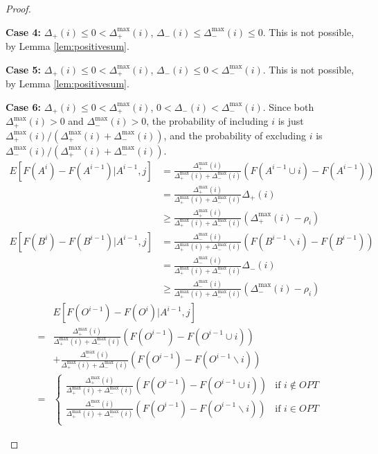 \documentclass{article} %
\begin{document}
\begin{proof}
\begin{description}
\item\textbf{Case 4:} $\Delta_+(i) \leq 0 < \Delta_+^{\max}(i)$, $\Delta_-(i) \leq \Delta_-^{\max}(i) \leq 0$.
This is not possible, by Lemma \ref{lem:positivesum}.

\item\textbf{Case 5:} $\Delta_+(i) \leq 0 < \Delta_+^{\max}(i)$, $\Delta_-(i) \leq 0 < \Delta_-^{\max}(i)$.
This is not possible, by Lemma \ref{lem:positivesum}.

\item\textbf{Case 6:} $\Delta_+(i) \leq 0 < \Delta_+^{\max}(i)$, $0 < \Delta_-(i) < \Delta_-^{\max}(i)$.
Since both $\Delta_+^{\max}(i)>0$ and $\Delta_-^{\max}(i)>0$, the probability of including $i$ is just $\Delta_+^{\max}(i) / (\Delta_+^{\max}(i) + \Delta_-^{\max}(i))$, and the probability of excluding $i$ is $\Delta_-^{\max}(i) / (\Delta_+^{\max}(i) + \Delta_-^{\max}(i))$.
\begin{align*}
E[F(A^i) - F(A^{i-1}) | A^{i-1}, j]
&= \frac{\Delta_+^{\max}(i)}{\Delta_+^{\max}(i) + \Delta_-^{\max}(i)} (F(A^{i-1}\cup i) - F(A^{i-1}))\\
&= \frac{\Delta_+^{\max}(i)}{\Delta_+^{\max}(i) + \Delta_-^{\max}(i)} \Delta_+(i)\\
&\geq \frac{\Delta_+^{\max}(i)}{\Delta_+^{\max}(i) + \Delta_-^{\max}(i)} (\Delta_+^{\max}(i) - \rho_i)\\
E[F(B^i) - F(B^{i-1}) | A^{i-1}, j]
&= \frac{\Delta_-^{\max}(i)}{\Delta_+^{\max}(i) + \Delta_-^{\max}(i)} (F(B^{i-1}\backslash i) - F(B^{i-1}))\\
&= \frac{\Delta_-^{\max}(i)}{\Delta_+^{\max}(i) + \Delta_-^{\max}(i)} \Delta_-(i)\\
&\geq \frac{\Delta_-^{\max}(i)}{\Delta_+^{\max}(i) + \Delta_-^{\max}(i)} (\Delta_-^{\max}(i) - \rho_i)
\end{align*}
\begin{align*}
&E[F(O^{i-1}) - F(O^i) | A^{i-1}, j]\\
=&   \frac{\Delta_+^{\max}(i)}{\Delta_+^{\max}(i) + \Delta_-^{\max}(i)} (F(O^{i-1}) - F(O^{i-1} \cup i)) \\
 & + \frac{\Delta_-^{\max}(i)}{\Delta_+^{\max}(i) + \Delta_-^{\max}(i)} (F(O^{i-1}) - F(O^{i-1} \backslash i)) \\
=&\begin{cases}
    \frac{\Delta_+^{\max}(i)}{\Delta_+^{\max}(i) + \Delta_-^{\max}(i)} (F(O^{i-1}) - F(O^{i-1} \cup i))       & \text{if $i\not\in OPT$}\\
    \frac{\Delta_-^{\max}(i)}{\Delta_+^{\max}(i) + \Delta_-^{\max}(i)} (F(O^{i-1}) - F(O^{i-1} \backslash i)) & \text{if $i    \in OPT$}\\

\end{cases}
\end{align*}
\end{description}
\end{proof}
\end{document}

